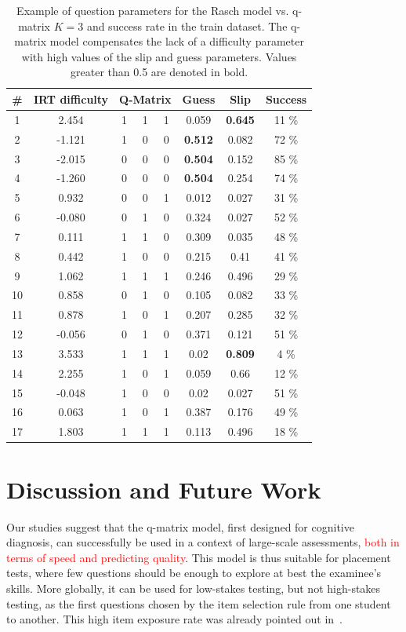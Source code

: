 \documentclass{sig-alternate}
\newcommand\alert[1]{\textcolor{red}{#1}}
\begin{document}
\begin{table}
\small\centering\begin{tabular}{c|c|ccccc|c}
\# & IRT difficulty & 	\multicolumn{3}{c}{Q-Matrix} & Guess & Slip & Success\\
\hline
1 & 2.454 & 	1 & 1 & 1 & 0.059 & \textbf{0.645} & 11 \% \\
2 & -1.121 & 	1 & 0 & 0 & \textbf{0.512} & 0.082 & 72 \% \\
3 & -2.015 & 	0 & 0 & 0 & \textbf{0.504} & 0.152 & 85 \% \\
4 & -1.260 & 	0 & 0 & 0 & \textbf{0.504} & 0.254 & 74 \% \\
5 & 0.932 & 	0 & 0 & 1 & 0.012 & 0.027 & 31 \% \\
6 & -0.080 & 	0 & 1 & 0 & 0.324 & 0.027 & 52 \% \\
7 & 0.111 & 	1 & 1 & 0 & 0.309 & 0.035 & 48 \% \\
8 & 0.442 & 	1 & 0 & 0 & 0.215 & 0.41 & 41 \% \\
9 & 1.062 & 	1 & 1 & 1 & 0.246 & 0.496 & 29 \% \\
10 & 0.858 & 	0 & 1 & 0 & 0.105 & 0.082 & 33 \% \\
11 & 0.878 & 	1 & 0 & 1 & 0.207 & 0.285 & 32 \% \\
12 & -0.056 & 	0 & 1 & 0 & 0.371 & 0.121 & 51 \% \\
13 & 3.533 & 	1 & 1 & 1 & 0.02 & \textbf{0.809} & 4 \% \\
14 & 2.255 & 	1 & 0 & 1 & 0.059 & 0.66 & 12 \% \\
15 & -0.048 & 	1 & 0 & 0 & 0.02 & 0.027 & 51 \% \\
16 & 0.063 & 	1 & 0 & 1 & 0.387 & 0.176 & 49 \% \\
17 & 1.803 & 	1 & 1 & 1 & 0.113 & 0.496 & 18 \%
\end{tabular}
\caption{Example of question parameters for the Rasch model vs. q-matrix $K = 3$ and success rate in the train dataset. The q-matrix model compensates the lack of a difficulty parameter with high values of the slip and guess parameters. Values greater than 0.5 are denoted in bold.}
\label{tab:example}
\end{table}

\section{Discussion and Future Work}

Our studies suggest that the q-matrix model, first designed for cognitive diagnosis, can successfully be used in a context of large-scale assessments, \alert{both in terms of speed and predicting quality}. This model is thus suitable for placement tests, where few questions should be enough to explore at best the examinee's skills. More globally, it can be used for low-stakes testing, but not high-stakes testing, as the first questions chosen by the item selection rule from one student to another. This high item exposure rate was already pointed out in~\cite{Cheng2009}.
\end{document}
